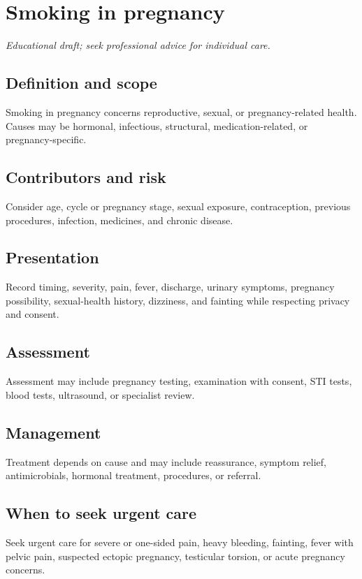 \chapter{Smoking in pregnancy}
\medskip
\noindent\textit{Educational draft; seek professional advice for individual care.}

\section*{Definition and scope}
Smoking in pregnancy concerns reproductive, sexual, or pregnancy-related health. Causes may be hormonal, infectious, structural, medication-related, or pregnancy-specific.

\section*{Contributors and risk}
Consider age, cycle or pregnancy stage, sexual exposure, contraception, previous procedures, infection, medicines, and chronic disease.

\section*{Presentation}
Record timing, severity, pain, fever, discharge, urinary symptoms, pregnancy possibility, sexual-health history, dizziness, and fainting while respecting privacy and consent.

\section*{Assessment}
Assessment may include pregnancy testing, examination with consent, STI tests, blood tests, ultrasound, or specialist review.

\section*{Management}
Treatment depends on cause and may include reassurance, symptom relief, antimicrobials, hormonal treatment, procedures, or referral.

\section*{When to seek urgent care}
Seek urgent care for severe or one-sided pain, heavy bleeding, fainting, fever with pelvic pain, suspected ectopic pregnancy, testicular torsion, or acute pregnancy concerns.

